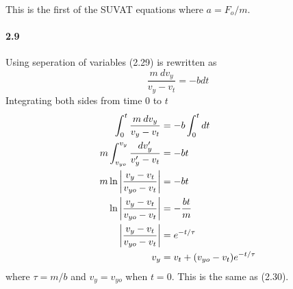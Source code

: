 \documentclass[../problems.tex]{subfiles}
\begin{document}
This is the first of the SUVAT equations where $a = F_o/m$.

\paragraph{2.9} Using seperation of variables (2.29) is rewritten as
\begin{equation*}
    \frac{m \: dv_y}{v_y - v_t} = -b dt
\end{equation*}
\barh 
Integrating both sides from time 0 to $t$
\begin{align*}
    \int_0^t \frac{m \: dv_y}{v_y - v_t} &= -b \int_0^t dt \\
    m \int_{v_{yo}}^{v_y} \frac{dv_y'}{v_y' - v_t} &= -bt \\
    m \ln \abs{\frac{v_y - v_t}{v_{yo} - v_t}} &= -bt \\
    \ln \abs{\frac{v_y - v_t}{v_{yo} - v_t}} &= -\frac{bt}{m} \\
    \abs{\frac{v_y - v_t}{v_{yo} - v_t}} &= e^{-t/\tau} \\
    v_y &= v_t + (v_{yo} - v_t)e^{-t/\tau}
\end{align*}
where $\tau = m/b$ and $v_y = v_{yo}$ when $t = 0$. This is the same as (2.30). 
\end{document}
